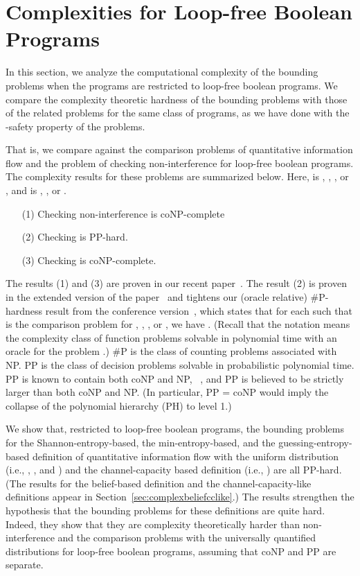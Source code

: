 \documentclass{llncs}
\begin{document}
\section{Complexities for Loop-free Boolean Programs}

\label{sec:complex}

In this section, we analyze the computational complexity of the
bounding problems when the programs are restricted to loop-free
boolean programs.  We compare the complexity theoretic
hardness of the bounding problems with those of the related problems
for the same class of programs, as we have done with the -safety
property of the problems.

That is, we compare against the comparison problems of quantitative
information flow and the problem of checking non-interference for
loop-free boolean programs.  The complexity results for these problems
are summarized below.  Here,  is , , , or , and  is , , or .
\begin{itemize}
\item[(1)] Checking non-interference is coNP-complete
\item[(2)] Checking  is PP-hard.
\item[(3)] Checking  is coNP-complete.
\end{itemize}
The results (1) and (3) are proven in our recent
paper~\cite{DBLP:conf/csfw/yasuoka2010}.  The result (2) is proven in
the extended version of the paper~\cite{yasuoka:toplas2010submit} and
tightens our (oracle relative) \#P-hardness result from the conference
version~\cite{DBLP:conf/csfw/yasuoka2010}, which states that for each
 such that  is the comparison problem for , , , or , we have .  (Recall that the notation  means the
complexity class of function problems solvable in polynomial time with
an oracle for the problem .)  \#P is the class of counting problems
associated with NP.  PP is the class of decision problems solvable in
probabilistic polynomial time.  PP is known to contain both coNP and
NP, ~\cite{toda91}, and PP is believed to be strictly
larger than both coNP and NP.  (In particular, PP = coNP would imply
the collapse of the polynomial hierarchy (PH) to level 1.)


We show that, restricted to loop-free boolean programs, the bounding
problems for the Shannon-entropy-based, the min-entropy-based, and the
guessing-entropy-based definition of quantitative information flow with
the uniform distribution (i.e., , , and
) and the channel-capacity based definition (i.e., ) are all PP-hard.  (The results for the belief-based definition
and the channel-capacity-like definitions appear in
Section~\ref{sec:complexbeliefcclike}.) The results strengthen the
hypothesis that the bounding problems for these definitions are quite
hard.  Indeed, they show that they are complexity theoretically harder
than non-interference and the comparison problems with the universally
quantified distributions for loop-free boolean programs, assuming that
coNP and PP are separate.
\end{document}
